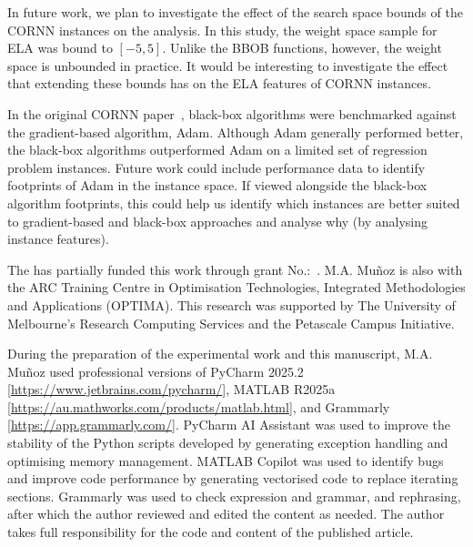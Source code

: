 \documentclass[acmsmall,screen,review,anonymous]{acmart}
\begin{document}
In future work, we plan to investigate the effect of the search space bounds of the CORNN instances on the analysis. In this study, the weight space sample for ELA was bound to $\left[-5,5\right]$. Unlike the BBOB functions, however, the weight space is unbounded in practice. It would be interesting to investigate the effect that extending these bounds has on the ELA features of CORNN instances.

In the original CORNN paper~\cite{Malan2022}, black-box algorithms were benchmarked against the gradient-based algorithm, Adam. Although Adam generally performed better, the black-box algorithms outperformed Adam on a limited set of regression problem instances. Future work could include performance data to identify footprints of Adam in the instance space. If viewed alongside the black-box algorithm footprints, this could help us identify which instances are better suited to gradient-based and black-box approaches and analyse why (by analysing instance features).

\begin{acks}
    The  has partially funded this work through grant No.:~. M.A. Muñoz is also with the ARC Training Centre in Optimisation Technologies, Integrated Methodologies and Applications (OPTIMA). This research was supported by The University of Melbourne’s Research Computing Services and the Petascale Campus Initiative.
    
    During the preparation of the experimental work and this manuscript, M.A. Muñoz used professional versions of PyCharm 2025.2 [\url{https://www.jetbrains.com/pycharm/}], MATLAB R2025a [\url{https://au.mathworks.com/products/matlab.html}], and Grammarly [\url{https://app.grammarly.com/}]. PyCharm AI Assistant was used to improve the stability of the Python scripts developed by generating exception handling and optimising memory management. MATLAB Copilot was used to identify bugs and improve code performance by generating vectorised code to replace iterating sections. Grammarly was used to check expression and grammar, and rephrasing, after which the author reviewed and edited the content as needed. The author takes full responsibility for the code and content of the published article.
\end{acks}
%


\end{document}
